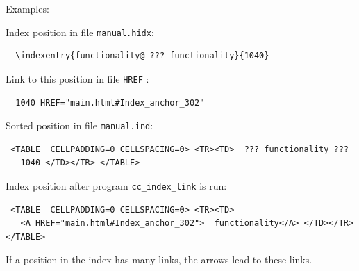 Examples:

Index position in file \verb|manual.hidx|:
  \begin{verbatim}
  \indexentry{functionality@ ??? functionality}{1040}
  \end{verbatim}

Link to this position in file \verb|HREF| :
  \begin{verbatim}
  1040 HREF="main.html#Index_anchor_302"
  \end{verbatim}

Sorted position in file \verb|manual.ind|:
 \begin{verbatim}
 <TABLE  CELLPADDING=0 CELLSPACING=0> <TR><TD>  ??? functionality ??? 
   1040 </TD></TR> </TABLE>
 \end{verbatim}

Index position after program \verb|cc_index_link| is run:
 \begin{verbatim}
 <TABLE  CELLPADDING=0 CELLSPACING=0> <TR><TD> 
   <A HREF="main.html#Index_anchor_302">  functionality</A> </TD></TR> </TABLE>
 \end{verbatim}


If a position in the index has many links, the arrows lead to these links.


